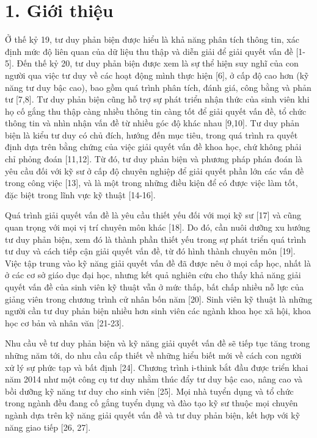 \section{1. Giới thiệu}

Ở thế kỷ 19, tư duy phản biện được hiểu là khả năng phân tích thông tin, xác định mức độ liên quan của dữ liệu thu thập và diễn giải để giải quyết vấn đề {[}1-5{]}. Đến thế kỷ 20, tư duy phản biện được xem là sự thể hiện suy nghĩ của con người qua việc tư duy về các hoạt động mình thực hiện {[}6{]}, ở cấp độ cao hơn (kỹ năng tư duy bậc cao), bao gồm quá trình phân tích, đánh giá, công bằng và phản tư {[}7,8{]}. Tư duy phản biện cũng hỗ trợ sự phát triển nhận thức của sinh viên khi họ cố gắng thu thập càng nhiều thông tin càng tốt để giải quyết vấn đề, tổ chức thông tin và nhìn nhận vấn đề từ nhiều góc độ khác nhau {[}9,10{]}. Tư duy phản biện là kiểu tư duy có chủ đích, hướng đến mục tiêu, trong quá trình ra quyết định dựa trên bằng chứng của việc giải quyết vấn đề khoa học, chứ không phải chỉ phỏng đoán {[}11,12{]}. Từ đó, tư duy phản biện và phương pháp phán đoán là yêu cầu đối với kỹ sư ở cấp độ chuyên nghiệp để giải quyết phần lớn các vấn đề trong công việc {[}13{]}, và là một trong những điều kiện để có được việc làm tốt, đặc biệt trong lĩnh vực kỹ thuật {[}14-16{]}.

Quá trình giải quyết vấn đề là yêu cầu thiết yếu đối với mọi kỹ sư {[}17{]} và cũng quan trọng với mọi vị trí chuyên môn khác {[}18{]}. Do đó, cần nuôi dưỡng xu hướng tư duy phản biện, xem đó là thành phần thiết yếu trong sự phát triển quá trình tư duy và cách tiếp cận giải quyết vấn đề, từ đó hình thành chuyên môn {[}19{]}. Việc tập trung vào kỹ năng giải quyết vấn đề đã được nêu ở mọi cấp học, nhất là ở các cơ sở giáo dục đại học, nhưng kết quả nghiên cứu cho thấy khả năng giải quyết vấn đề của sinh viên kỹ thuật vẫn ở mức thấp, bất chấp nhiều nỗ lực của giảng viên trong chương trình cử nhân bốn năm {[}20{]}. Sinh viên kỹ thuật là những người cần tư duy phản biện nhiều hơn sinh viên các ngành khoa học xã hội, khoa học cơ bản và nhân văn {[}21-23{]}.

Nhu cầu về tư duy phản biện và kỹ năng giải quyết vấn đề sẽ tiếp tục tăng trong những năm tới, do nhu cầu cấp thiết về những hiểu biết mới về cách con người xử lý sự phức tạp và bất định {[}24{]}. Chương trình i-think bắt đầu được triển khai năm 2014 như một công cụ tư duy nhằm thúc đẩy tư duy bậc cao, nâng cao và bồi dưỡng kỹ năng tư duy cho sinh viên {[}25{]}. Mọi nhà tuyển dụng và tổ chức trong ngành đều đang cố gắng tuyển dụng và đào tạo kỹ sư thuộc mọi chuyên ngành dựa trên kỹ năng giải quyết vấn đề và tư duy phản biện, kết hợp với kỹ năng giao tiếp {[}26, 27{]}.

